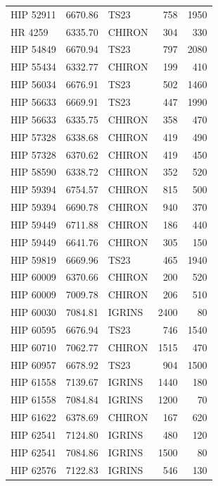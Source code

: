 \begin{scriptsize}
\begin{longtable}{|l|rlrr|}
   HIP 52911 &  6670.86 &       TS23 &      758 &  1950 \\
     HR 4259 &  6335.70 &     CHIRON &      304 &   330 \\
   HIP 54849 &  6670.94 &       TS23 &      797 &  2080 \\
   HIP 55434 &  6332.77 &     CHIRON &      199 &   410 \\
   HIP 56034 &  6676.91 &       TS23 &      502 &  1460 \\
   HIP 56633 &  6669.91 &       TS23 &      447 &  1990 \\
   HIP 56633 &  6335.75 &     CHIRON &      358 &   470 \\
   HIP 57328 &  6338.68 &     CHIRON &      419 &   490 \\
   HIP 57328 &  6370.62 &     CHIRON &      419 &   450 \\
   HIP 58590 &  6338.72 &     CHIRON &      352 &   520 \\
   HIP 59394 &  6754.57 &     CHIRON &      815 &   500 \\
   HIP 59394 &  6690.78 &     CHIRON &      940 &   370 \\
   HIP 59449 &  6711.88 &     CHIRON &      186 &   440 \\
   HIP 59449 &  6641.76 &     CHIRON &      305 &   150 \\
   HIP 59819 &  6669.96 &       TS23 &      465 &  1940 \\
   HIP 60009 &  6370.66 &     CHIRON &      200 &   520 \\
   HIP 60009 &  7009.78 &     CHIRON &      206 &   510 \\
   HIP 60030 &  7084.81 &     IGRINS &     2400 &    80 \\
   HIP 60595 &  6676.94 &       TS23 &      746 &  1540 \\
   HIP 60710 &  7062.77 &     CHIRON &     1515 &   470 \\
   HIP 60957 &  6678.92 &       TS23 &      904 &  1500 \\
   HIP 61558 &  7139.67 &     IGRINS &     1440 &   180 \\
   HIP 61558 &  7084.84 &     IGRINS &     1200 &    70 \\
   HIP 61622 &  6378.69 &     CHIRON &      167 &   620 \\
   HIP 62541 &  7124.80 &     IGRINS &      480 &   120 \\
   HIP 62541 &  7084.86 &     IGRINS &     1500 &    80 \\
   HIP 62576 &  7122.83 &     IGRINS &      546 &   130 \\

\end{longtable}
\end{scriptsize}
